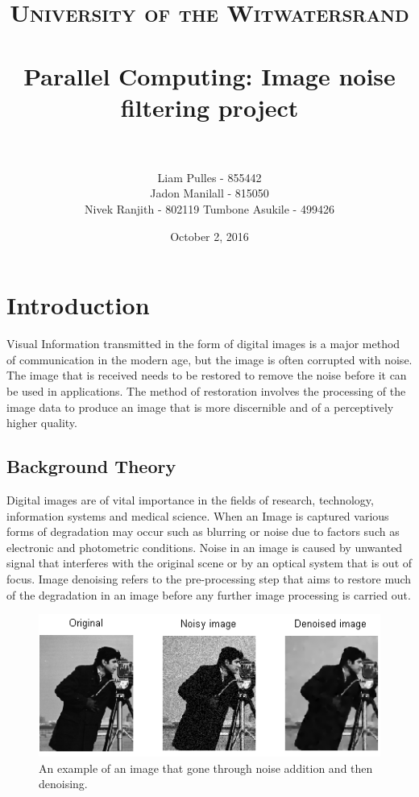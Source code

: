 \documentclass[paper=a4, fontsize=11pt]{scrartcl} %
\title{	
\normalfont \normalsize 
\textsc{University of the Witwatersrand} \\ [25pt] %
\horrule{0.5pt} \\[0.4cm] %
\huge Parallel Computing: Image noise filtering project \\ %
\horrule{2pt} \\[0.5cm] %
}
\author{Liam Pulles - 855442\\
  Jadon Manilall - 815050\\
  Nivek Ranjith - 802119
  Tumbone Asukile - 499426
        } %
\date{\normalsize October 2, 2016} %
\numberwithin{equation}{section} %
\numberwithin{figure}{section} %
\numberwithin{table}{section} %
\begin{document}
\maketitle %

\section{Introduction}
Visual Information transmitted in the form of digital images is a major method of communication in the modern age, but the image is often corrupted with noise. The image that is received needs to be restored to remove the noise before it can be used in applications. The method of restoration involves the processing of the image data to produce an image that is more discernible and of a perceptively higher quality.
\subsection{Background Theory}
Digital images are of vital importance in the fields of research, technology, information systems and medical science. When an Image is captured various forms of degradation may occur such as blurring or noise due to factors such as electronic and photometric conditions. Noise in an image is caused by unwanted signal that interferes with the original scene or by an optical system that is out of focus. Image denoising refers to the pre-processing step that aims to restore much of the degradation in an image before any further image processing is carried out.

\begin{figure}[H]
	\centering
	\includegraphics[scale=1]{"camera man"}
	\caption{An example of an image that gone through noise addition and then denoising.}
        \label{camera}
\end{figure}
\end{document}
